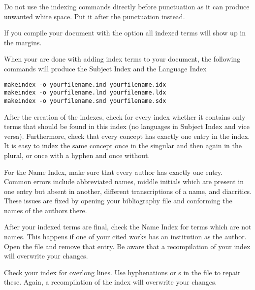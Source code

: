 Do not use the indexing commands directly before punctuation as it can produce unwanted white space. Put it after the punctuation instead.

If you compile your document with the option  all indexed terms will show up in the margins.

When your are done with adding index terms to your document, the following commands will produce the Subject Index and the Language Index
\begin{verbatim}
makeindex -o yourfilename.ind yourfilename.idx
makeindex -o yourfilename.lnd yourfilename.ldx
makeindex -o yourfilename.snd yourfilename.sdx
\end{verbatim}
 

After the creation of the indexes, check for every index whether it contains only terms that should be found in this index (no languages in Subject Index and vice versa). Furthermore, check that every concept has exactly one entry in the index. It is easy to index the same concept once in the singular and then again in the plural, or once with a hyphen and once without. 

For the Name Index, make sure that every author has exactly one entry. Common errors include abbreviated names, middle initials which are present in one entry but absent in another, different transcriptions of a name, and diacritics. These issues are fixed by opening your bibliography file and conforming the names of the authors there.

After your indexed terms are final, check the Name Index for terms which are not names. This happens if one of your cited works has an institution as the author. Open the  file and remove that entry. Be aware that a recompilation of your index will overwrite your changes.

Check your index for overlong lines. Use hyphenations  or s in the  file to repair these. Again, a recompilation of the index will overwrite your changes.
